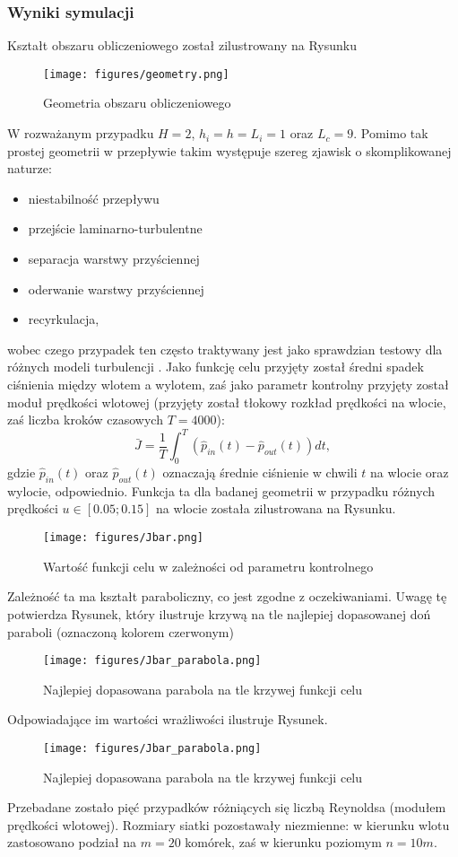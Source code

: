 \documentclass[12pt]{article}
\begin{document}
\subsubsection{Wyniki symulacji}
Kształt obszaru obliczeniowego został zilustrowany na Rysunku
\begin{figure}[H]
	\texttt{[image: figures/geometry.png]} 
	\centering
	\caption{Geometria obszaru obliczeniowego}
\end{figure}
W rozważanym przypadku $ H = 2 $, $ h_{i}=h=L_{i}=1 $ oraz $ L_{c}=9 $.\newline
Pomimo tak prostej geometrii w przepływie takim występuje szereg zjawisk o skomplikowanej naturze:
\begin{itemize}
	\item niestabilność przepływu
	\item przejście laminarno-turbulentne
	\item separacja warstwy przyściennej
	\item oderwanie warstwy przyściennej
	\item recyrkulacja,
\end{itemize}
wobec czego przypadek ten często traktywany jest jako sprawdzian testowy dla różnych modeli turbulencji \cite{Salazar}. \newline
Jako funkcję celu przyjęty został średni spadek ciśnienia między wlotem a wylotem, zaś jako parametr kontrolny przyjęty został moduł prędkości wlotowej (przyjęty został tłokowy rozkład prędkości na wlocie, zaś liczba kroków czasowych $ T = 4000 $):
\begin{equation}
\bar{J} = \frac{1}{T}\int_{0}^{T}(\hat{p}_{in}(t)-\hat{p}_{out}(t))dt,
\label{J_numerical}
\end{equation}
gdzie $ \hat{p}_{in}(t) $ oraz $ \hat{p}_{out}(t) $ oznaczają średnie ciśnienie w chwili $ t $ na wlocie oraz wylocie, odpowiednio. Funkcja ta dla badanej geometrii w przypadku różnych prędkości $ u \in [0.05 ; 0.15]$ na wlocie została zilustrowana na Rysunku.
\begin{figure}[H]
	\texttt{[image: figures/Jbar.png]} 
	\centering
	\caption{Wartość funkcji celu w zależności od parametru kontrolnego}
\end{figure}
Zależność ta ma kształt paraboliczny, co jest zgodne z oczekiwaniami. Uwagę tę potwierdza Rysunek, który ilustruje krzywą na tle najlepiej dopasowanej doń paraboli (oznaczoną kolorem czerwonym)
\begin{figure}[H]
	\texttt{[image: figures/Jbar\_parabola.png]} 
	\centering
	\caption{Najlepiej dopasowana parabola na tle krzywej funkcji celu}
\end{figure}
Odpowiadające im wartości wrażliwości ilustruje Rysunek.
\begin{figure}[H]
	\texttt{[image: figures/Jbar\_parabola.png]} 
	\centering
	\caption{Najlepiej dopasowana parabola na tle krzywej funkcji celu}
\end{figure}
Przebadane zostało pięć przypadków różniących się liczbą Reynoldsa (modułem prędkości wlotowej). Rozmiary siatki pozostawały niezmienne: w kierunku wlotu zastosowano podział na $ m=20 $ komórek, zaś w kierunku poziomym $ n=10m $.
\end{document}
